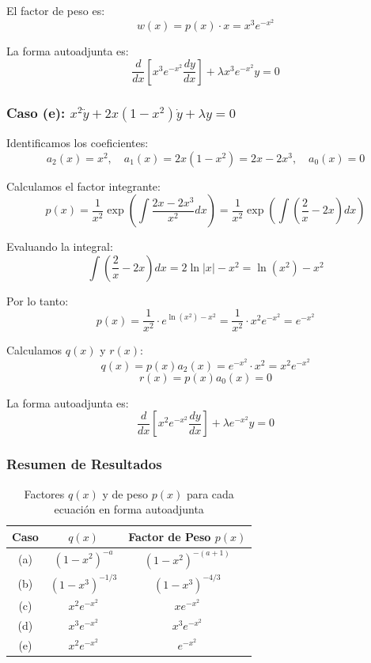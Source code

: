 \documentclass[a4paper]{article}
\begin{document}
El factor de peso es:
$$
w(x) = p(x) \cdot x = x^3 e^{-x^2}
$$

La forma autoadjunta es:
$$
\boxed{\frac{d}{dx}\left[x^3 e^{-x^2}\frac{dy}{dx}\right] + \lambda x^3 e^{-x^2}y = 0}
$$

\subsubsection{Caso (e): $x^2\ddot{y} + 2x(1 - x^2)\dot{y} + \lambda y = 0$}

Identificamos los coeficientes:
$$
a_2(x) = x^2, \quad a_1(x) = 2x(1 - x^2) = 2x - 2x^3, \quad a_0(x) = 0
$$

Calculamos el factor integrante:
$$
p(x) = \frac{1}{x^2} \exp\left(\int \frac{2x - 2x^3}{x^2} dx\right) = \frac{1}{x^2} \exp\left(\int \left(\frac{2}{x} - 2x\right) dx\right)
$$

Evaluando la integral:
$$
\int \left(\frac{2}{x} - 2x\right) dx = 2\ln|x| - x^2 = \ln(x^2) - x^2
$$

Por lo tanto:
$$
p(x) = \frac{1}{x^2} \cdot e^{\ln(x^2) - x^2} = \frac{1}{x^2} \cdot x^2 e^{-x^2} = e^{-x^2}
$$

Calculamos $q(x)$ y $r(x)$:
$$
q(x) = p(x)a_2(x) = e^{-x^2} \cdot x^2 = x^2 e^{-x^2}
$$
$$
r(x) = p(x)a_0(x) = 0
$$

La forma autoadjunta es:
$$
\boxed{\frac{d}{dx}\left[x^2 e^{-x^2}\frac{dy}{dx}\right] + \lambda e^{-x^2}y = 0}
$$

\subsubsection{Resumen de Resultados}

\begin{table}[h]
\centering
\begin{tabular}{|c|c|c|}
\hline
\textbf{Caso} & \textbf{$q(x)$} & \textbf{Factor de Peso $p(x)$} \\
\hline
(a) & $(1 - x^2)^{-a}$ & $(1 - x^2)^{-(a+1)}$ \\
\hline
(b) & $(1 - x^3)^{-1/3}$ & $(1 - x^3)^{-4/3}$ \\
\hline
(c) & $x^2 e^{-x^2}$ & $x e^{-x^2}$ \\
\hline
(d) & $x^3 e^{-x^2}$ & $x^3 e^{-x^2}$ \\
\hline
(e) & $x^2 e^{-x^2}$ & $e^{-x^2}$ \\
\hline
\end{tabular}
\caption{Factores $q(x)$ y de peso $p(x)$ para cada ecuación en forma autoadjunta}
\end{table}
\end{document}

